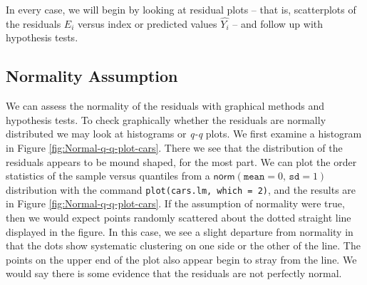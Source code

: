 \documentclass[captions=tableheading]{scrbook}
\begin{document}
In every case, we will begin by looking at residual plots -- that is, scatterplots of the residuals \(E_{i}\) versus index or predicted values \(\hat{Y_{i}}\) -- and follow up with hypothesis tests.
\subsection{Normality Assumption}
\label{sec-11-4-1}

\label{sub:Normality-Assumption}

We can assess the normality of the residuals with graphical methods and hypothesis tests. To check graphically whether the residuals are normally distributed we may look at histograms or \emph{q-q} plots. We first examine a histogram in Figure \ref{fig:Normal-q-q-plot-cars}. There we see that the distribution of the residuals appears to be mound shaped, for the most part. We can plot the order statistics of the sample versus quantiles from a \(\mathsf{norm}(\mathtt{mean}=0,\,\mathtt{sd}=1)\) distribution with the command \texttt{plot(cars.lm, which = 2)}, and the results are in Figure \ref{fig:Normal-q-q-plot-cars}. If the assumption of normality were true, then we would expect points randomly scattered about the dotted straight line displayed in the figure. In this case, we see a slight departure from normality in that the dots show systematic clustering on one side or the other of the line. The points on the upper end of the plot also appear begin to stray from the line. We would say there is some evidence that the residuals are not perfectly normal. 
\end{document}

